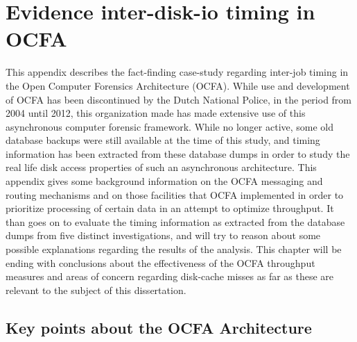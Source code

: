 \chapter{Evidence inter-disk-io timing in OCFA}
This appendix describes the fact-finding case-study regarding inter-job timing in the Open Computer Forensics Architecture (OCFA). While use and development of OCFA has been discontinued by the Dutch National Police, in the period from 2004 until 2012, this organization made has made extensive use of this asynchronous computer forensic framework. While no longer active, some old database backups were still available at the time of this study, and timing information has been extracted from these database dumps in order to study the real life disk access properties of such an asynchronous architecture. This appendix gives some background information on the OCFA messaging and routing mechanisms and on those facilities that OCFA implemented in order to prioritize processing of certain data in an attempt to optimize throughput. It than goes on to evaluate the timing information as extracted from the database dumps from five distinct investigations, and will try to reason about some possible explanations regarding the results of the analysis. This chapter will be ending with conclusions about the effectiveness of the OCFA throughput measures and areas of concern regarding disk-cache misses as far as these are relevant to the subject of this dissertation.
\section{Key points about the OCFA Architecture}
